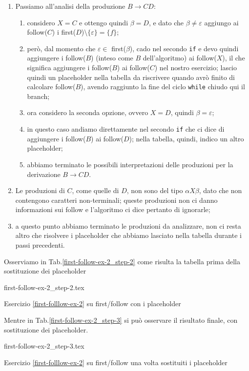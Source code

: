 \documentclass[class=book, crop=false, oneside, 12pt]{standalone}
\begin{document}
\begin{enumerate}
\begin{enumerate}
    \end{enumerate}
    \item Passiamo all'analisi della produzione \(B \to CD\):
    \begin{enumerate}
        \item considero \(X = C\) e ottengo quindi \(\beta = D\), e dato che \(\beta \neq \varepsilon\) aggiungo ai follow(\(C\)) i first(\(D\))\( \setminus \{\varepsilon\} = \{f\}\);
        \item però, dal momento che \(\varepsilon \in \) first(\(\beta\)), cado nel secondo \texttt{if} e devo quindi aggiungere i follow(\(B\)) (inteso come \(B\) dell'algoritmo) ai follow(\(X\)), il che significa aggiungere i follow(\(B\)) ai follow(\(C\)) nel nostro esercizio; lascio quindi un placeholder nella tabella da riscrivere quando avrò finito di calcolare follow(\(B\)), avendo raggiunto la fine del ciclo \texttt{while} chiudo qui il branch;
        \item ora considero la seconda opzione, ovvero \(X = D\), quindi \(\beta = \varepsilon\);
        \item in questo caso andiamo direttamente nel secondo \texttt{if} che ci dice di aggiungere i follow(\(B\)) ai follow(\(D\)); nella tabella, quindi, indico un altro placeholder;
        \item abbiamo terminato le possibili interpretazioni delle produzioni per la derivazione \(B \to CD\).
    \end{enumerate}
    \item Le produzioni di \(C\), come quelle di \(D\), non sono del tipo \(\alpha X \beta\), dato che non contengono caratteri non-terminali; queste produzioni non ci danno informazioni sui follow e l’algoritmo ci dice pertanto di ignorarle;
    \item a questo punto abbiamo terminato le produzioni da analizzare, non ci resta altro che risolvere i placeholder che abbiamo lasciato nella tabella durante i passi precedenti.
\end{enumerate}
Osserviamo in Tab.\ref{first-follow-ex-2_step-2} come risulta la tabella prima della sostituzione dei placeholder
\begin{table}[H]
	\centering
	{first-follow-ex-2_step-2.tex}
    \caption{Esercizio \ref{first-folllow-ex-2} su first/follow con i placeholder}
    \label{first-follow-ex-2_step-2}
\end{table}
Mentre in Tab.\ref{first-follow-ex-2_step-3} si può osservare il risultato finale, con sostituzione dei placeholder.
\begin{table}[H]
	\centering
	{first-follow-ex-2_step-3.tex}
    \caption{Esercizio \ref{first-folllow-ex-2} su first/follow una volta sostituiti i placeholder}
    \label{first-follow-ex-2_step-3}
\end{table}
\end{document}
